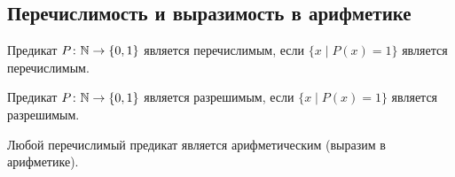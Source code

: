 \subsection{Перечислимость и выразимость в арифметике}

\begin{Def}
	Предикат $P \colon \mathbb{N} \to \{0, 1\}$ является перечислимым, если $\{ x \mid P(x) = 1 \}$ является перечислимым.
\end{Def}
\begin{Def}
	Предикат $P \colon \mathbb{N} \to \{0, 1\}$ является разрешимым, если $\{ x \mid P(x) = 1 \}$ является разрешимым.
\end{Def}

\begin{theorem}
	Любой перечислимый предикат является арифметическим (выразим в арифметике).
\end{theorem}

